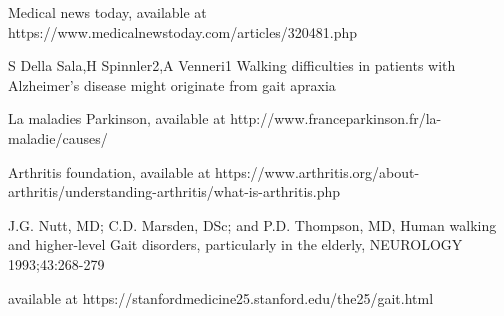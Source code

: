 \documentclass[a4paper, parskip=full]{scrartcl}
\begin{document}
\newpage
\begin{thebibliography}{9}
	

	

Medical news today, available at https://www.medicalnewstoday.com/articles/320481.php




S Della Sala,H Spinnler2,A Venneri1
Walking difficulties in patients with Alzheimer’s disease might originate from gait apraxia




La maladies Parkinson, available at   http://www.franceparkinson.fr/la-maladie/causes/


Arthritis foundation, available at  https://www.arthritis.org/about-arthritis/understanding-arthritis/what-is-arthritis.php


J.G. Nutt, MD; C.D. Marsden, DSc; and P.D. Thompson, MD, Human walking and higher-level
Gait disorders, particularly in the elderly, NEUROLOGY 1993;43:268-279


 available at https://stanfordmedicine25.stanford.edu/the25/gait.html
	
	
\end{thebibliography}
 
\end{document}

